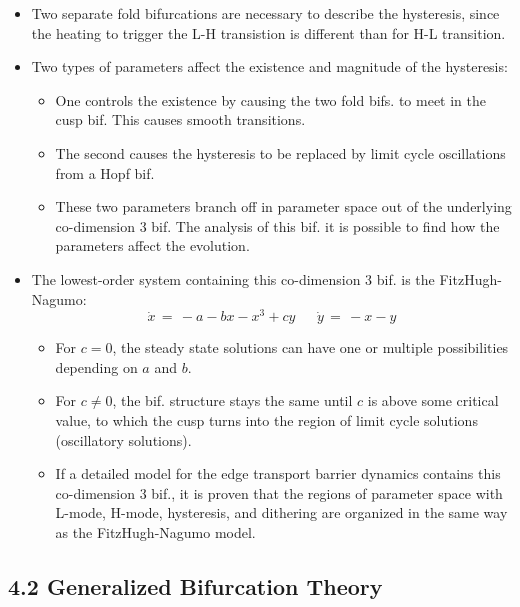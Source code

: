 \documentclass[a4paper]{article}
\begin{document}
\begin{itemize}
\item
  Two separate fold bifurcations are necessary to describe the
  hysteresis, since the heating to trigger the L-H transistion is
  different than for H-L transition.
\item
  Two types of parameters affect the existence and magnitude of the
  hysteresis:

  \begin{itemize}
  \item
    One controls the existence by causing the two fold bifs. to meet in
    the cusp bif. This causes smooth transitions.
  \item
    The second causes the hysteresis to be replaced by limit cycle
    oscillations from a Hopf bif.
  \item
    These two parameters branch off in parameter space out of the
    underlying co-dimension 3 bif. The analysis of this bif. it is
    possible to find how the parameters affect the evolution.
  \end{itemize}
\item
  The lowest-order system containing this co-dimension 3 bif. is the
  FitzHugh-Nagumo:
  \[\dot{x} \,=\, -a - bx - x^3 + cy ~~~~~~~ \dot{y} \,=\, -x - y\]

  \begin{itemize}
  \item
    For $c = 0$, the steady state solutions can have one or multiple
    possibilities depending on $a$ and $b$.
  \item
    For $c \neq 0$, the bif. structure stays the same until $c$ is above
    some critical value, to which the cusp turns into the region of
    limit cycle solutions (oscillatory solutions).
  \item
    If a detailed model for the edge transport barrier dynamics contains
    this co-dimension 3 bif., it is proven that the regions of parameter
    space with L-mode, H-mode, hysteresis, and dithering are organized
    in the same way as the FitzHugh-Nagumo model.
  \end{itemize}
\end{itemize}

\subsection{4.2 Generalized Bifurcation
Theory}\label{generalized-bifurcation-theory}
\end{document}
